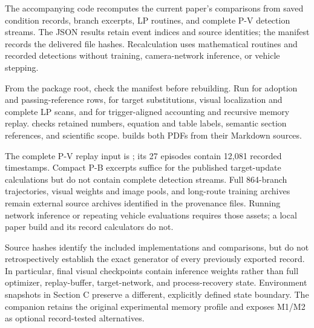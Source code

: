 \documentclass[letterpaper,journal,onecolumn]{IEEEtran}
\begin{document}
The accompanying code recomputes the current paper's comparisons from saved condition records, branch excerpts, LP routines, and complete P-V detection streams. The JSON results retain event indices and source identities; the manifest records the delivered file hashes. Recalculation uses mathematical routines and recorded detections without training, camera-network inference, or vehicle stepping.

From the package root, check the manifest before rebuilding. Run  for adoption and passing-reference rows,  for target substitutions, visual localization and complete LP scans, and  for trigger-aligned accounting and recursive memory replay.  checks retained numbers, equation and table labels, semantic section references, and scientific scope.  builds both PDFs from their Markdown sources.

The complete P-V replay input is ; its 27 episodes contain 12,081 recorded timestamps. Compact P-B excerpts suffice for the published target-update calculations but do not contain complete detection streams. Full 864-branch trajectories, visual weights and image pools, and long-route training archives remain external source archives identified in the provenance files. Running network inference or repeating vehicle evaluations requires those assets; a local paper build and its record calculators do not.

Source hashes identify the included implementations and comparisons, but do not retrospectively establish the exact generator of every previously exported record. In particular, final visual checkpoints contain inference weights rather than full optimizer, replay-buffer, target-network, and process-recovery state. Environment snapshots in Section C preserve a different, explicitly defined state boundary. The companion retains the original experimental memory profile and exposes M1/M2 as optional record-tested alternatives.
\end{document}

